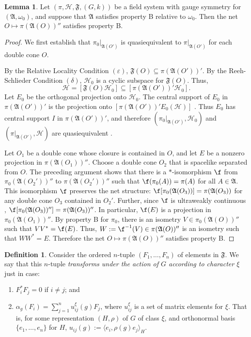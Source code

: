 \documentclass[11pt]{article}
\newcommand{\alg}[1]{\mathfrak{#1}}
\theoremstyle{definition}
\newtheorem{lemma}[thm]{Lemma}
\theoremstyle{definition}
\newtheorem{defn}[thm]{Definition}
\theoremstyle{remark}
\newcommand{\ve}{\varepsilon}
\def\2#1{{\mathcal #1}}
\def\al#1{{\mathfrak #1}}
\def\a{\alpha} \def\b{\beta} \def\g{\gamma} \def\d{\delta}
\def\om{\omega} \def\Om{\Omega} \def\dd{\partial} \def\D{\Delta}
\newcommand{\fields}{(\pi ,\2H ,\alg{F},(G,k))}
\begin{document}
\begin{lemma} Let $\fields$ be a field system with
  gauge symmetry for $(\al A,\om _0)$, and suppose that
  $\al A$ satisfies property B relative to $\om _0$.
  Then the net $O\mapsto \pi (\alg{A}(O))''$ satisfies
  property B.  \label{BB}
\end{lemma}

\begin{proof} We first establish that $\pi
  _0|_{\alg{A}(O')}$ is quasiequivalent to $\pi
  |_{\alg{A}(O')}$ for each double cone $O$.

  By the Relative Locality Condition $(\ve )$, $\al
  F(O)\subseteq \pi (\al A(O'))'$.  By the
  Reeh-Schlieder Condition $(\d )$, $\2H _0$ is a
  cyclic subspace for $\al F(O)$.  Thus,
$$ \2H =[\al F(O)\2H _0]\subseteq [\pi (\al A(O'))'\2H _0] .$$
Let $E_0$ be the orthogonal projection onto $\2H _0$.  The central
support of $E_0$ in $\pi (\al A(O'))'$ is the projection onto
$[\pi(\alg{A}(O'))'E_0(\2H )]$ \cite[Prop.\ 5.5.2]{kr}.  Thus $E_0$
has central support $I$ in $\pi (\al A(O'))'$, and therefore $(\pi
_0|_{\al A(O')},\2H _0)$ and $(\pi |_{\al A(O')},\2H )$ are
quasiequivalent \cite[Thm.\ 10.3.3]{kr}.

Let $O_1$ be a double cone whose closure is contained in $O$, and let
$E$ be a nonzero projection in $\pi (\alg{A}(O_1))''$.  Choose a
double cone $O_2$ that is spacelike separated from $O$.  The
preceding argument shows that there is a $*$-isomorphism $\f$ from
$\pi _0(\alg{A}(O_2'))''$ to $\pi (\alg{A}(O_2'))''$ such that $\f
(\pi _0(A))=\pi (A)$ for all $A\in \alg{A}$.  This isomorphism $\f$
preserves the net structure: $\f [\pi _0(\alg{A}(O_3))]=\pi
(\alg{A}(O_3))$ for any double cone $O_3$ contained in $O_2'$.
Further, since $\f$ is ultraweakly continuous \cite[Cor.\ 7.1.16]{kr},
$\f [\pi _0(\alg{A}(O_3))'']=\pi (\alg{A}(O_3))''$.  In particular,
$\f (E)$ is a projection in $\pi _0 (\alg{A}(O_1))''$.  By property B
for $\pi _0$, there is an isometry $V\in \pi _0(\alg{A}(O))''$ such
that $VV^*=\f (E)$.  Thus, $W:=\f ^{-1}(V)\in \pi (\alg{A}(O))''$ is
an isometry such that $WW^*=E$.  Therefore the net $O\mapsto \pi
(\alg{A}(O))''$ satisfies property B.
\end{proof}

\begin{defn} Consider the ordered $n$-tuple $(F_1,\dots ,F_n)$ of
  elements in $\alg{F}$.  We say that this $n$-tuple \emph{transforms
    under the action of $G$ according to character $\xi$} just in
  case:
  \begin{enumerate}
\item $F_{i}^*F_j=0$ if $i\neq j$; and 
\item $\a _g(F_i) =\sum _{j=1}^{n}u^{\xi}_{ij}(g)F_{j}$, where
  $u^{\xi}_{ij}$ is a set of matrix elements for $\xi$.  That
  is, for some representation $(H,\rho )$ of $G$ of class $\xi$,
  and orthonormal basis $\{ e_1,\dots ,e_n\}$ for $H$,
  $u_{ij}(g):=\langle e_{i},\rho (g)e_j\rangle _{H}$.
\end{enumerate}
\end{defn}
\end{document}
